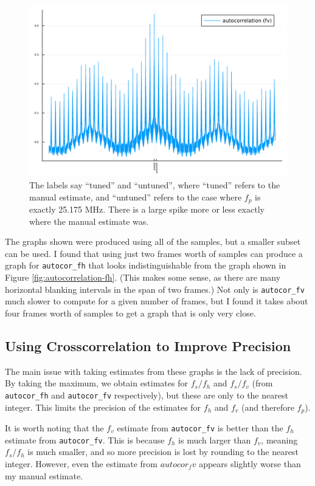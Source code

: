 \documentclass{article}
\newcommand*{\code}[1]{\texttt{#1}}
\begin{document}
\begin{figure}
    \centering
    \includegraphics[width=\linewidth]{images/hi_res_autocor_fv.png}
    \caption{The labels say ``tuned'' and ``untuned'', where ``tuned'' refers to the manual estimate, and ``untuned'' refers to the case where $f_p$ is exactly 25.175 MHz. There is a large spike more or less exactly where the manual estimate was.}
    \label{fig:autocorrelation-fv}
\end{figure}

The graphs shown were produced using all of the samples, but a smaller subset can be used. I found that using just two frames worth of samples can produce a graph for \code{autocor_fh} that looks indistinguishable from the graph shown in Figure \ref{fig:autocorrelation-fh}. (This makes some sense, as there are many horizontal blanking intervals in the span of two frames.) Not only is \code{autocor_fv} much slower to compute for a given number of frames, but I found it takes about four frames worth of samples to get a graph that is only very close.

\subsection*{Using Crosscorrelation to Improve Precision}

The main issue with taking estimates from these graphs is the lack of precision. By taking the maximum, we obtain estimates for $f_s / f_h$ and $f_s / f_v$ (from \code{autocor_fh} and \code{autocor_fv} respectively), but these are only to the nearest integer. This limits the precision of the estimates for $f_h$ and $f_v$ (and therefore $f_p$).

It is worth noting that the $f_v$ estimate from \code{autocor_fv} is better than the $f_h$ estimate from \code{autocor_fv}. This is because $f_h$ is much larger than $f_v$, meaning $f_s / f_h$ is much smaller, and so more precision is lost by rounding to the nearest integer. However, even the estimate from $autocor_fv$ appears slightly worse than my manual estimate.
\end{document}
